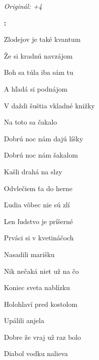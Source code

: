 \begin{song}


\begin{headerbox}
\textit{Originál: +4}
\end{headerbox}

\begin{hchordbox}
\end{hchordbox}

\Large

\bigskip

\Intro\textbf{:}      \par

\bigskip

Zlodejov je také kvantum \par
Že si kradnú navzájom \par
{}Boh sa túla iba sám tu \par
A hľadá si podnájom \par

\bigskip

V daždi šuštia vkladné knižky \par
Na toto sa čakalo \par
{}Dobrú noc nám dajú líšky \par
Dobrú noc nám šakalom \par

\bigskip

\begin{chorusbox}{\Refren}
Kašli drahá na slzy \par
Odvlečiem ťa do herne \par
Ľudia vôbec nie sú zlí \par
Len ľudstvo je príšerné \par
\end{chorusbox}

\bigskip

Prváci si v kvetináčoch \par
Nasadili marišku \par
{}Nik nečaká niet už na čo \par
Koniec sveta nablízku \par

\bigskip

Holohlaví pred kostolom \par
Upálili anjela \par
{}Dobre že vraj už raz bolo \par
Diabol vodku nalieva \par

\bigskip

\Refren {} \par

\bigskip


\end{song}
